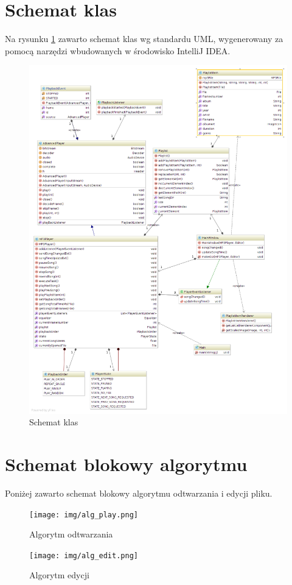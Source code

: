 \documentclass[12pt,a4paper,notitlepage]{article}
\begin{document}
\section{Schemat klas}
Na rysunku \ref{fig:diagram} zawarto schemat klas wg standardu UML, wygenerowany za pomocą narzędzi wbudowanych w środowisko IntelliJ IDEA.
\begin{figure}[H]
 \centering
 \includegraphics[width=1.1\textwidth]{img/diagram.png}
 \caption{Schemat klas}
 \label{fig:diagram}
\end{figure}

\section{Schemat blokowy algorytmu}
Poniżej zawarto schemat blokowy algorytmu odtwarzania i edycji pliku.

\begin{figure}[H]
 \centering
 \texttt{[image: img/alg\_play.png]}
 \caption{Algorytm odtwarzania}
 \label{fig:alg_play}
\end{figure}

\begin{figure}[H]
 \centering
 \texttt{[image: img/alg\_edit.png]}
 \caption{Algorytm edycji}
 \label{fig:alg_edit}
\end{figure}
\end{document}
